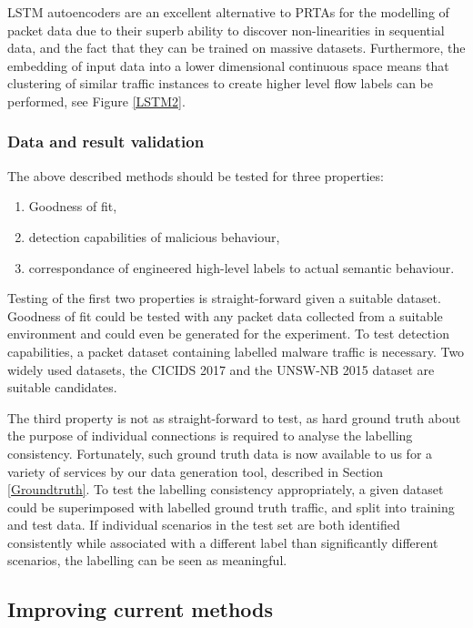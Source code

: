 \documentclass[a4paper,12pt,twoside]{report}
\begin{document}
LSTM autoencoders are an excellent alternative to PRTAs for the modelling of packet data due to their superb ability to discover non-linearities in sequential data, and the fact that they can be trained on massive datasets. Furthermore, the embedding of input data into a lower dimensional continuous space means that clustering of similar traffic instances to create higher level flow labels can be performed, see Figure \ref{LSTM2}.

\subsubsection{Data and result validation}

The above described methods should be tested for three properties:

\begin{enumerate}
\item Goodness of fit,
\item detection capabilities of malicious behaviour,
\item correspondance of engineered high-level labels to actual semantic behaviour.
\end{enumerate}

Testing of the first two properties is straight-forward given a suitable dataset. Goodness of fit could be tested with any packet data collected from a suitable environment and could even be generated for the experiment. To test detection capabilities, a packet dataset containing labelled malware traffic  is necessary. Two widely used datasets, the CICIDS 2017 and the UNSW-NB 2015 dataset are suitable candidates.

The third property is not as straight-forward to test, as hard ground truth about the purpose of individual connections is required to analyse the labelling consistency. Fortunately, such ground truth data is now available to us for a variety of services by our data generation tool, described in Section \ref{Groundtruth}. To test the labelling consistency appropriately, a given dataset could be superimposed with labelled ground truth traffic, and split into training and test data. If individual scenarios in the test set are both identified consistently  while associated with a different label than significantly different scenarios, the labelling can be seen as meaningful.  


\subsection{Improving current methods}\label{Curmet}
\end{document}
